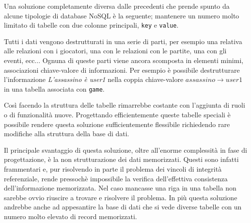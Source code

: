 Una soluzione completamente diversa dalle precedenti che prende spunto da alcune tipologie di database NoSQL è la seguente; mantenere un numero molto limitato di tabelle con due colonne principali, \texttt{key} e \texttt{value}.

Tutti i dati vengono destrutturati in una serie di parti, per esempio una relativa alle relazioni con i giocatori, una con le relazioni con le partite, una con gli eventi, ecc... Ognuna di queste parti viene ancora scomposta in elementi minimi, associazioni chiave-valore di informazioni. Per esempio è possibile destrutturare l'informazione \emph{L'assassino è user1} nella coppia chiave-valore $assassino \rightarrow user1$ in una tabella associata con \texttt{game}.

Così facendo la struttura delle tabelle rimarrebbe costante con l'aggiunta di ruoli o di funzionalità nuove. Progettando efficientemente queste tabelle speciali è possibile rendere questa soluzione sufficientemente flessibile richiedendo rare modifiche alla struttura della base di dati.

Il principale svantaggio di questa soluzione, oltre all'enorme complessità in fase di progettazione, è la non strutturazione dei dati memorizzati. Questi sono infatti frammentari e, pur risolvendo in parte il problema dei vincoli di integrità referenziale, rende pressochè impossibile la verifica dell'effettiva consistenza dell'informazione memorizzata. Nel caso mancasse una riga in una tabella non sarebbe ovvio riuscire a trovare e risolvere il problema. In più questa soluzione andrebbe anche ad appesantire la base di dati che si vede diverse tabelle con un numero molto elevato di record memorizzati.